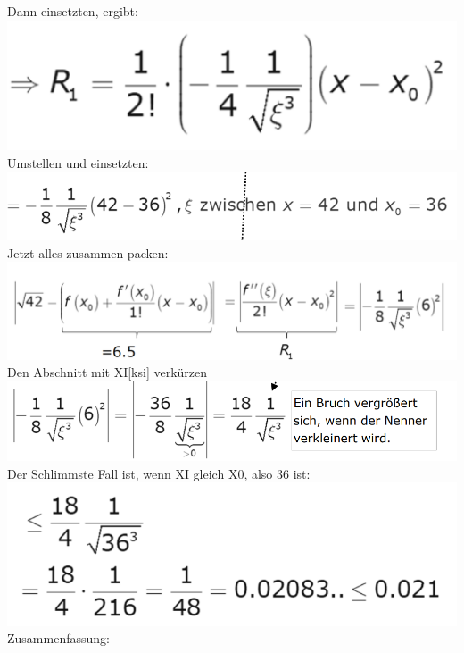 \documentclass[12pt,a4paper]{article}
\begin{document}
\newpage
Dann einsetzten, ergibt:\\
\includegraphics[width=1\textwidth]{BIlder/V1/15.png}\\
Umstellen und einsetzten:\\
\includegraphics[width=1\textwidth]{BIlder/V1/16.png}\\
Jetzt alles zusammen packen:\\
\includegraphics[width=1\textwidth]{BIlder/V1/17.png}\\
Den Abschnitt mit XI[ksi] verkürzen\\
\includegraphics[width=1\textwidth]{BIlder/V1/18.png}\\
Der Schlimmste Fall ist, wenn XI gleich X0, also 36 ist:\\
\includegraphics[width=1\textwidth]{BIlder/V1/19.png}\\
Zusammenfassung:\\
\end{document}
